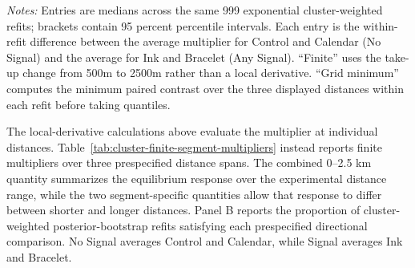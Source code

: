 \documentclass[12pt]{article}
\begin{document}
\begin{table}[htbp]
  \centering
  \scriptsize
  \caption{Paired cluster weighted-likelihood contrasts in social multipliers}
  \label{tab:cluster-multiplier-contrasts}
  \resizebox{\textwidth}{!}{%
  }
  \begin{minipage}{0.94\linewidth}
    \vspace{0.4em}\footnotesize
    \textit{Notes:} Entries are medians across the same 999 exponential
    cluster-weighted refits; brackets contain 95 percent percentile intervals.
    Each entry is the within-refit difference between
    the average multiplier for Control and Calendar (No Signal) and the
    average for Ink and Bracelet (Any Signal). ``Finite'' uses the take-up
    change from 500m to 2500m rather than a local derivative. ``Grid minimum'' computes the
    minimum paired contrast over the three displayed distances within each
    refit before taking quantiles.
  \end{minipage}
\end{table}

The local-derivative calculations above evaluate the multiplier at individual
distances. Table~\ref{tab:cluster-finite-segment-multipliers} instead reports
finite multipliers over three prespecified distance spans. The combined
0--2.5 km quantity summarizes the equilibrium response over the experimental
distance range, while the two segment-specific quantities allow that response
to differ between shorter and longer distances. Panel B reports the proportion
of cluster-weighted posterior-bootstrap refits satisfying each prespecified
directional comparison. No Signal averages Control and Calendar, while Signal
averages Ink and Bracelet.

\begin{table}[htbp]
  \centering
  \scriptsize
  \caption{Finite social multipliers over the experimental distance range}
  \label{tab:cluster-finite-segment-multipliers}
  
\end{table}
\end{document}
